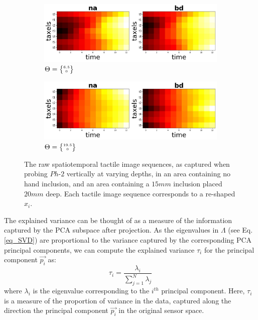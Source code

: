 \documentclass[]{interact}
\theoremstyle{plain}%
\theoremstyle{definition}
\theoremstyle{remark}
\begin{document}
\begin{figure}[]
	\centering
	\begin{subfigure}[b]{.485\textwidth}
		\includegraphics[width=\textwidth]{./figs/nabd_rawdataf_Vertical-d6_5.jpg}
		\caption{$\Theta = \tiny{\begin{Bmatrix}6.5\\ 0\end{Bmatrix}}$}
		\label{rawnabs:d6_5}
	\end{subfigure}
	\hspace{0.005\textwidth}
	\begin{subfigure}[b]{.485\textwidth}
		\includegraphics[width=\textwidth]{./figs/nabd_rawdataf_Vertical-d19_5.jpg}
		\caption{$\Theta = \tiny{\begin{Bmatrix}19.5\\ 0\end{Bmatrix}}$}
		\label{rawnabs:d19_5}
	\end{subfigure}
	\caption{The raw spatiotemporal tactile image sequences, as captured when probing $Ph\text{-}2$ vertically at varying depths, in an area containing no hand inclusion, and an area containing 
		a $15mm$ inclusion placed $20mm$ deep. Each tactile image sequence corresponds to a re-shaped $x_i$.}
	\label{rawnabs}
\end{figure}

The explained variance can be thought of as a measure of the information captured by the PCA subspace after projection. 
As the eigenvalues in $\Lambda$ (see Eq. \ref{eq_SVD}) are proportional to the variance captured by the corresponding 
PCA principal components, we can compute the explained variance $\tau_i$ for the principal component $\vec{p_i}$ as:
\begin{equation}
	\tau_i=\frac{\lambda_i}{\sum_{j=1}^{N}\lambda_j}
\end{equation}
where $\lambda_i$ is the eigenvalue corresponding to the $i^{th}$ principal component. Here, $\tau_i$ is 
a measure of the proportion of variance in the data, captured along the direction the principal component $\vec{p_i}$ 
in the original sensor space.
\end{document}
